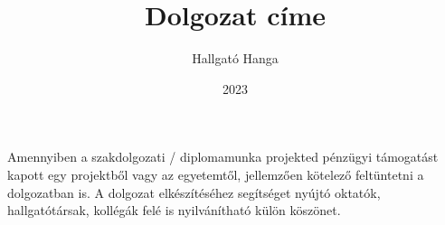 \documentclass[
]{elteikthesis}[2023/04/10]
\title{Dolgozat címe} %
\date{2023} %
\author{Hallgató Hanga}
\affiliation{egyetemi tanársegéd} %
\begin{document}


\maketitle
%

\tableofcontents
\cleardoublepage


\cleardoublepage


\cleardoublepage


\cleardoublepage


\cleardoublepage

\chapter*{\acklabel}
Amennyiben a szakdolgozati / diplomamunka projekted pénzügyi támogatást kapott egy projektből vagy az egyetemtől, jellemzően kötelező feltüntetni a dolgozatban is. A dolgozat elkészítéséhez segítséget nyújtó oktatók, hallgatótársak, kollégák felé is nyilvánítható külön köszönet.

%

\cleardoublepage
\end{document}
